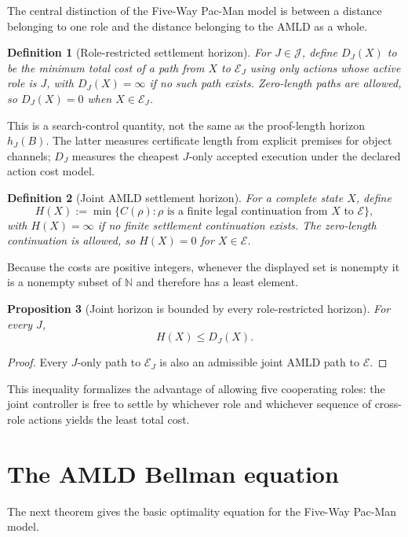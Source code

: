 \documentclass[11pt]{article}
\newtheorem{definition}{Definition}[section]
\newtheorem{proposition}[definition]{Proposition}
\theoremstyle{remark}
\newcommand{\N}{\mathbb N}
\newcommand{\Roles}{\mathcal J}
\newcommand{\Exit}{\mathcal E}
\begin{document}
The central distinction of the Five-Way Pac-Man model is between a distance belonging to one role and the distance belonging to the AMLD as a whole.

\begin{definition}[Role-restricted settlement horizon]
For $J\in\Roles$, define $D_J(X)$ to be the minimum total cost of a path from $X$ to $\Exit_J$ using only actions whose active role is $J$, with $D_J(X)=\infty$ if no such path exists. Zero-length paths are allowed, so $D_J(X)=0$ when $X\in\Exit_J$.
\end{definition}

This is a search-control quantity, not the same as the proof-length horizon $h_J(B)$. The latter measures certificate length from explicit premises for object channels; $D_J$ measures the cheapest $J$-only accepted execution under the declared action cost model.

\begin{definition}[Joint AMLD settlement horizon]
For a complete state $X$, define
\[
H(X):=\min\{C(\rho):\rho\text{ is a finite legal continuation from }X\text{ to }\Exit\},
\]
with $H(X)=\infty$ if no finite settlement continuation exists. The zero-length continuation is allowed, so $H(X)=0$ for $X\in\Exit$.
\end{definition}

Because the costs are positive integers, whenever the displayed set is nonempty it is a nonempty subset of $\N$ and therefore has a least element.

\begin{proposition}[Joint horizon is bounded by every role-restricted horizon]
For every $J$,
\[
H(X)\le D_J(X).
\]
\end{proposition}
\begin{proof}
Every $J$-only path to $\Exit_J$ is also an admissible joint AMLD path to $\Exit$.
\end{proof}

This inequality formalizes the advantage of allowing five cooperating roles: the joint controller is free to settle by whichever role and whichever sequence of cross-role actions yields the least total cost.

\section{The AMLD Bellman equation}

The next theorem gives the basic optimality equation for the Five-Way Pac-Man model.
\end{document}
